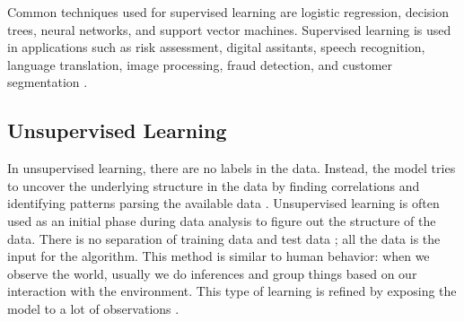 \documentclass[12pt]{report}
\begin{document}
	
	
	
	Common techniques used for supervised learning are logistic regression, decision trees, neural networks, and support vector machines.
	Supervised learning is used in applications such as risk assessment, digital assitants, speech recognition, language translation, 
	image processing, fraud detection, and  customer segmentation \cite{Nevala2017}.
	
	\subsection{Unsupervised Learning}
	In unsupervised learning, there are no labels in the data. Instead, the model tries to uncover the underlying structure in the data by 
	finding correlations and identifying patterns parsing the available data \cite{Nevala2017}. Unsupervised learning is often used as 
	an initial phase during data analysis to figure out the structure of the data. 
	There is no separation of training data and test data \cite{Shai2014}; all the data is the input for the algorithm. This method is similar to human behavior: when we observe the world, usually we do inferences and group things based on our interaction with the environment.
	This type of learning is refined by exposing the model to  a lot of observations \cite{Nevala2017}.
	
\end{document}

